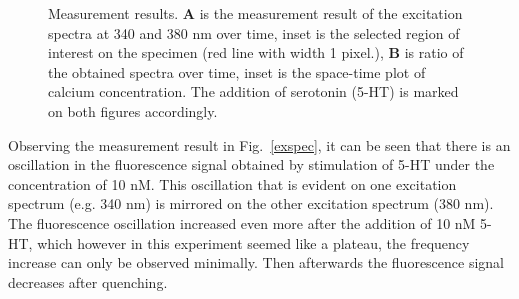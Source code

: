 \begin{figure}[ht]
\centering
{} \hfil
{}
\caption{Measurement results. \textbf{A} is the measurement result of the excitation spectra at 340 and 380 nm over time, inset is the selected region of interest on the specimen (red line with width 1 pixel.), \textbf{B} is ratio of the obtained spectra over time, inset is the space-time plot of calcium concentration. 
The addition of serotonin (5-HT) is marked on both figures accordingly.} 
\label{fig:CaIm}
\end{figure}

Observing the measurement result in Fig.~\ref{exspec}, it can be seen that there is an oscillation in the fluorescence signal obtained by stimulation of 5-HT under the concentration of 10 nM. 
This oscillation that is evident on one excitation spectrum (e.g. 340 nm) is mirrored on the other excitation spectrum (380 nm). 
The fluorescence oscillation increased even more after the addition of 10 nM 5-HT, which however in this experiment seemed like a plateau, the frequency increase can only be observed minimally. 
Then afterwards the fluorescence signal decreases after quenching.

